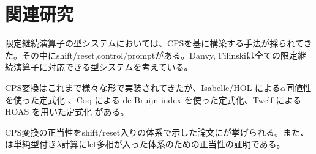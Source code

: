 \section{関連研究}
限定継続演算子の型システムにおいては、CPSを基に構築する手法が採られてきた。その中にshift/reset\cite{DF1989,AK2007},control/prompt\cite{KY2008}がある。Danvy, Filinski\cite{DF1989}は全ての限定継続演算子に対応できる型システムを考えている。

CPS変換はこれまで様々な形で実装されてきたが、Isabelle/HOL による$\alpha$同値性を使った定式化\cite{YK2003} 、Coq による de Bruijn index を使った定式化\cite{ZX2007}、Twelf による HOAS を用いた定式化\cite{YH2006} がある。

CPS変換の正当性をshift/reset入りの体系で示した論文に\cite{CHAM2020}が挙げられる。また、\cite{CHAM2018}は単純型付き$\lambda$計算に\textsf{let}多相が入った体系のための正当性の証明である。
